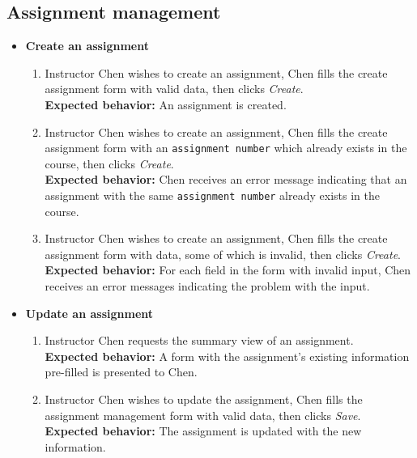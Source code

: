 \subsection{Assignment management}
\begin{itemize}
    \item \textbf{Create an assignment} \begin{enumerate}
        \item Instructor Chen wishes to create an assignment, Chen fills the
            create assignment form with valid data, then clicks \emph{Create}. \\
        {\bf Expected behavior:} An assignment is created.

        \item Instructor Chen wishes to create an assignment, Chen fills the
            create assignment form with an \texttt{assignment number}
            which already exists in the course, then clicks \emph{Create}. \\
        {\bf Expected behavior:} Chen receives an error message indicating
            that an assignment with the same \texttt{assignment number}
            already exists in the course.

        \item Instructor Chen wishes to create an assignment, Chen fills the
            create assignment form with data, some of which is invalid,
            then clicks \emph{Create}. \\
        {\bf Expected behavior:} For each field in the form with invalid input,
            Chen receives an error messages indicating the problem with the
            input.
    \end{enumerate}

    \item \textbf{Update an assignment} \begin{enumerate}
        \item Instructor Chen requests the summary view of an assignment. \\
        {\bf Expected behavior:} A form with the assignment's existing
            information pre-filled is presented to Chen.

        \item Instructor Chen wishes to update the assignment, Chen fills the
            assignment management form with valid data, then clicks \emph{Save}. \\
        {\bf Expected behavior:} The assignment is updated with the new
            information.


\end{enumerate}
\end{itemize}

